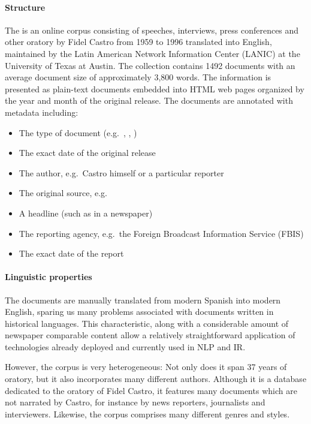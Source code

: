 \paragraph{Structure}
The  is an online corpus consisting of speeches, interviews, press conferences and other oratory by Fidel Castro from 1959 to 1996 translated into English, maintained by the Latin American Network Information Center (LANIC) at the University of Texas at Austin. The collection contains 1492 documents with an average document size of approximately 3,800 words. The information is presented as plain-text documents embedded into HTML web pages organized by the year and month of the original release. The documents are annotated with metadata including:

\begin{itemize}
\item The type of document (e.g.\ , , )
\item The exact date of the original release
\item The author, e.g.\ Castro himself or a particular reporter
\item The original source, e.g.\ 
\item A headline (such as in a newspaper)
\item The reporting agency, e.g.\ the Foreign Broadcast Information Service (FBIS)
\item The exact date of the report
\end{itemize}

\paragraph{Linguistic properties}
The documents are manually translated from modern Spanish into modern English, sparing us many problems associated with documents written in historical languages. This characteristic, along with a considerable amount of newspaper comparable content allow a relatively straightforward application of technologies already deployed and currently used in NLP and IR.

However, the corpus is very heterogeneous: Not only does it span 37 years of oratory, but it also incorporates many different authors. Although it is a database dedicated to the oratory of Fidel Castro, it features many documents which are not narrated by Castro, for instance by news reporters, journalists and interviewers. Likewise, the corpus comprises many different genres and styles.

